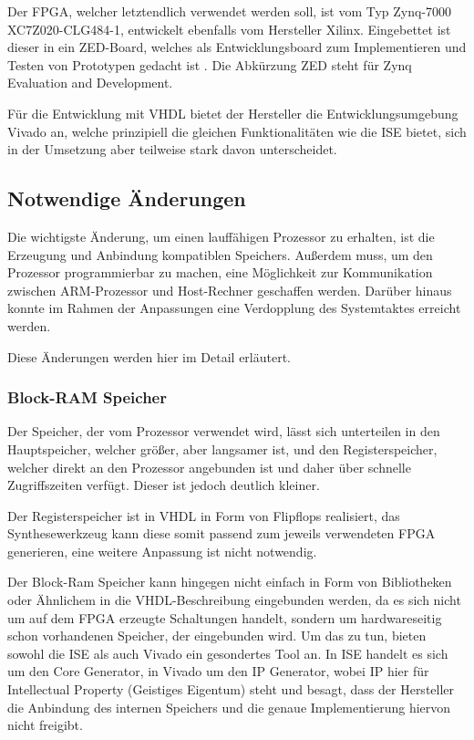 \documentclass[11pt,a4paper,titlepage]{article}
\begin{document}
Der FPGA, welcher letztendlich verwendet werden soll, ist vom Typ Zynq-7000 XC7Z020-CLG484-1, entwickelt ebenfalls vom Hersteller Xilinx. Eingebettet ist dieser in ein ZED-Board, welches als Entwicklungsboard zum Implementieren und Testen von Prototypen gedacht ist \cite{Zedboard}. Die Abkürzung ZED steht für Zynq Evaluation and Development.

Für die Entwicklung mit VHDL bietet der Hersteller die Entwicklungsumgebung Vivado an, welche prinzipiell die gleichen Funktionalitäten wie die ISE bietet, sich in der Umsetzung aber teilweise stark davon unterscheidet.

\subsection{Notwendige Änderungen}

Die wichtigste Änderung, um einen lauffähigen Prozessor zu erhalten, ist die Erzeugung und Anbindung kompatiblen Speichers. Außerdem muss, um den Prozessor programmierbar zu machen, eine Möglichkeit zur Kommunikation zwischen ARM-Prozessor und Host-Rechner geschaffen werden. Darüber hinaus konnte im Rahmen der Anpassungen eine Verdopplung des Systemtaktes erreicht werden.

Diese Änderungen werden hier im Detail erläutert.

\subsubsection{Block-RAM Speicher}
\label{sec:BRAM}

Der Speicher, der vom Prozessor verwendet wird, lässt sich unterteilen in den Hauptspeicher, welcher größer, aber langsamer ist, und den Registerspeicher, welcher direkt an den Prozessor angebunden ist und daher über schnelle Zugriffszeiten verfügt. Dieser ist jedoch deutlich kleiner. 

Der Registerspeicher ist in VHDL in Form von Flipflops realisiert, das Synthesewerkzeug kann diese somit passend zum jeweils verwendeten FPGA generieren, eine weitere Anpassung ist nicht notwendig.

Der Block-Ram Speicher kann hingegen nicht einfach in Form von Bibliotheken oder Ähnlichem in die VHDL-Beschreibung eingebunden werden, da es sich nicht um auf dem FPGA erzeugte Schaltungen handelt, sondern um hardwareseitig schon vorhandenen Speicher, der eingebunden wird. Um das zu tun, bieten sowohl die ISE als auch Vivado ein gesondertes Tool an. In ISE handelt es sich um den Core Generator, in Vivado um den IP Generator, wobei IP hier für Intellectual Property (Geistiges Eigentum) steht und besagt, dass der Hersteller die Anbindung des internen Speichers und die genaue Implementierung hiervon nicht freigibt.
\end{document}
